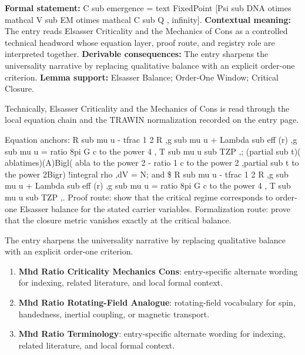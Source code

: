 \begingroup\footnotesize\setlength{\emergencystretch}{3em}\sloppy
\textbf{Formal statement:} C sub emergence = text FixedPoint [Psi sub DNA otimes mathcal V sub EM otimes mathcal C sub Q , infinity]. \textbf{Contextual meaning:} The entry reads Elsasser Criticality and the Mechanics of Cons as a controlled technical headword whose equation layer, proof route, and registry role are interpreted together. \textbf{Derivable consequences:} The entry sharpens the universality narrative by replacing qualitative balance with an explicit order-one criterion. \textbf{Lemma support:} Elsasser Balance; Order-One Window; Critical Closure.\par
\endgroup

Technically, Elsasser Criticality and the Mechanics of Cons is read through the local equation chain and the TRAWIN normalization recorded on the entry page.

Equation anchors: R sub mu u - tfrac 1 2 R ,g sub mu u + Lambda sub eff (r) ,g sub mu u = ratio 8pi G c to the power 4 , T sub mu u sub TZP ,; (partial sub t)( ablatimes)(A)Bigl( abla to the power 2 - ratio 1 c to the power 2 ,partial sub t to the power 2Bigr) !integral rho ,dV = N; and \$ R sub mu u - tfrac 1 2 R ,g sub mu u + Lambda sub eff (r) ,g sub mu u = ratio 8pi G c to the power 4 , T sub mu u sub TZP ,. Proof route: show that the critical regime corresponds to order-one Elsasser balance for the stated carrier variables. Formalization route: prove that the closure metric vanishes exactly at the critical balance.

The entry sharpens the universality narrative by replacing qualitative balance with an explicit order-one criterion.
\endgroup

\begin{enumerate}[leftmargin=1.6em,itemsep=6pt,topsep=4pt]
\item \textbf{Mhd Ratio Criticality Mechanics Cons}: entry-specific alternate wording for indexing, related literature, and local formal context.
\item \textbf{Mhd Ratio Rotating-Field Analogue}: rotating-field vocabulary for spin, handedness, inertial coupling, or magnetic transport.
\item \textbf{Mhd Ratio Terminology}: entry-specific alternate wording for indexing, related literature, and local formal context.
\end{enumerate}

